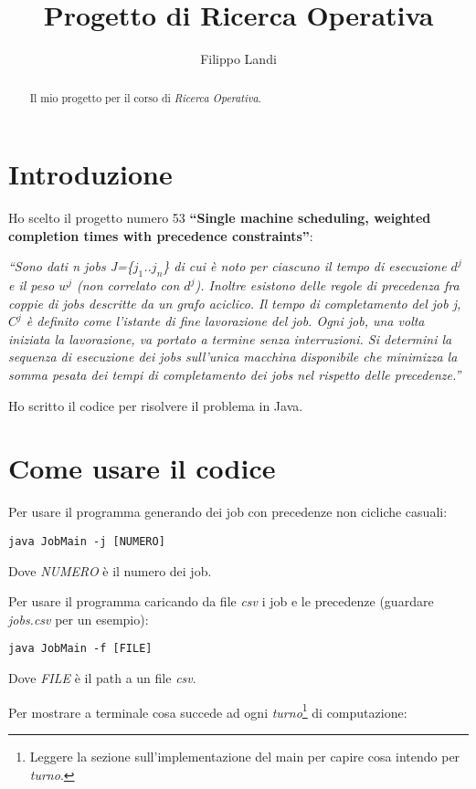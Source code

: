 \documentclass[12pt, letterpaper]{article}
\title{Progetto di Ricerca Operativa}
\author{Filippo Landi}
\begin{document}
\maketitle
\begin{abstract}
Il mio progetto per il corso di \textit{Ricerca Operativa}.
\end{abstract}

\section{Introduzione}
Ho scelto il progetto numero 53 \textbf{``Single machine scheduling, weighted completion times with precedence constraints''}:

\medskip
\textit{``Sono dati n jobs J=\{$j_1$..$j_n$\} di cui è noto per ciascuno il tempo di esecuzione $d^j$ e il peso $w^j$ (non correlato con $d^j$). Inoltre esistono delle regole di precedenza fra coppie di jobs descritte da un grafo aciclico. Il tempo di completamento del job j, $C^j$ è definito come l’istante di fine lavorazione del job. Ogni job, una volta iniziata la lavorazione, va portato a termine senza interruzioni. Si determini la sequenza di esecuzione dei jobs sull’unica macchina disponibile che minimizza la somma pesata dei tempi di completamento dei jobs nel rispetto delle precedenze.''}
\medskip

Ho scritto il codice per risolvere il problema in Java.

\section{Come usare il codice}

Per usare il programma generando dei job con precedenze non cicliche casuali:

\begin{verbatim}
java JobMain -j [NUMERO]
\end{verbatim}

Dove \textit{NUMERO} è il numero dei job.
\medskip

\noindent Per usare il programma caricando da file \textit{csv} i job e le precedenze (guardare \textit{jobs.csv} per un esempio):

\begin{verbatim}
java JobMain -f [FILE]
\end{verbatim}

Dove \textit{FILE} è il path a un file \textit{csv}.
\medskip

\noindent Per mostrare a terminale cosa succede ad ogni \textit{turno}\footnote{Leggere la sezione sull'implementazione del main per capire cosa intendo per \textit{turno}.} di computazione:
\end{document}
